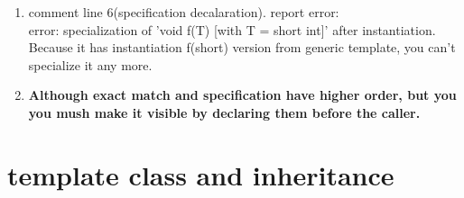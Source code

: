 \documentclass[a4paper,11pt,twoside]{book}
\begin{document}
\begin{itemize}
\begin{enumerate}
\begin{enumerate}
	\item comment line 6(specification decalaration). report error:\\
	error: specialization of 'void f(T) [with T = short int]' after instantiation.
	Because it has instantiation f(short) version from generic template, you can't specialize it any more.
	 
	\item \textbf{Although exact match and specification have higher order, but you you mush make it visible by declaring them before the caller.}
\end{enumerate}

\end{enumerate}

\end{itemize}


\section{template class and inheritance}
\end{document}
